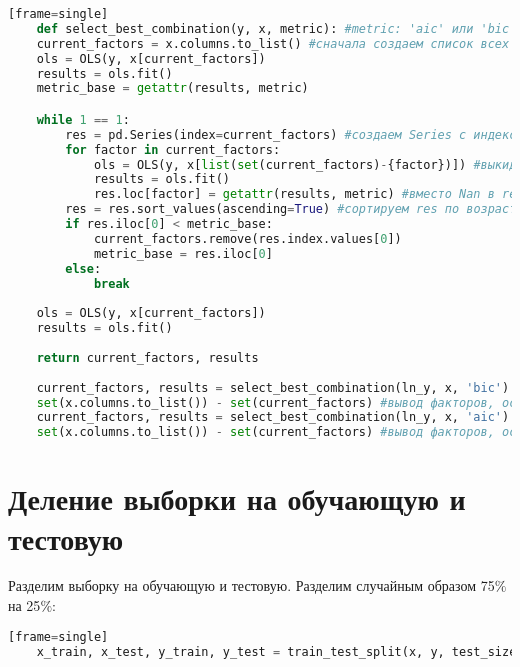 \begin{lstlisting}[language=Python][frame=single]
	def select_best_combination(y, x, metric): #metric: 'aic' или 'bic'
    current_factors = x.columns.to_list() #сначала создаем список всех наименований столбцов
    ols = OLS(y, x[current_factors]) 
    results = ols.fit()
    metric_base = getattr(results, metric) 

    while 1 == 1:
        res = pd.Series(index=current_factors) #создаем Series c индексом current_factors и значениями = Nan
        for factor in current_factors:
            ols = OLS(y, x[list(set(current_factors)-{factor})]) #выкидываем по очереди один столбец
            results = ols.fit()
            res.loc[factor] = getattr(results, metric) #вместо Nan в res записываем метрику, соответствующую модели без данного столбца
        res = res.sort_values(ascending=True) #сортируем res по возрастанию 
        if res.iloc[0] < metric_base:
            current_factors.remove(res.index.values[0])
            metric_base = res.iloc[0]
        else:
            break
            
    ols = OLS(y, x[current_factors])
    results = ols.fit()
    
    return current_factors, results
    
    current_factors, results = select_best_combination(ln_y, x, 'bic')
    set(x.columns.to_list()) - set(current_factors) #вывод факторов, основываясь на BIC
    current_factors, results = select_best_combination(ln_y, x, 'aic')
    set(x.columns.to_list()) - set(current_factors) #вывод факторов, основываясь на AIC
\end{lstlisting}

\section{Деление выборки на обучающую и тестовую}\label{cha:linreg2/sec:train+test}


	Разделим выборку на обучающую и тестовую. Разделим случайным образом 75$ \% $ на 25$ \% $:

\begin{lstlisting}[language=Python][frame=single]
	x_train, x_test, y_train, y_test = train_test_split(x, y, test_size=0.25, random_state=10)
\end{lstlisting}

